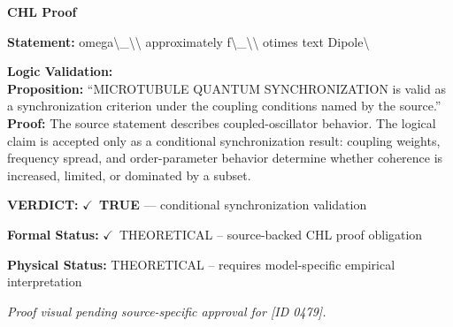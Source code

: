 \vspace{0.45em}
\noindent\textbf{CHL Proof}\par
\textbf{Statement:} omega\textbackslash{}\_\textbackslash{}\textbackslash{} approximately f\textbackslash{}\_\textbackslash{}\textbackslash{} otimes text Dipole\textbackslash{}

\textbf{Logic Validation:}\\
\textbf{Proposition:} ``MICROTUBULE QUANTUM SYNCHRONIZATION is valid as a synchronization criterion under the
coupling conditions named by the source.''\\
\textbf{Proof:} The source statement describes coupled-oscillator behavior. The logical claim is
accepted only as a conditional synchronization result: coupling weights, frequency
spread, and order-parameter behavior determine whether coherence is increased, limited,
or dominated by a subset.

\textbf{VERDICT:} \ensuremath{\checkmark}\ \textbf{TRUE} --- conditional synchronization validation

\textbf{Formal Status:} \ensuremath{\checkmark}\ THEORETICAL -- source-backed CHL proof obligation

\textbf{Physical Status:} THEORETICAL -- requires model-specific empirical interpretation
\par\vspace{0.45em}
\par
\vfill
\begingroup\footnotesize\itshape
Proof visual pending source-specific approval for [ID 0479].
\par\endgroup
\vfill
\endgroup
\endgroup
